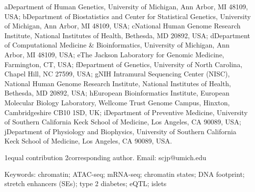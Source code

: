 aDepartment of Human Genetics, University of Michigan, Ann Arbor, MI 48109, USA; bDepartment of Biostatistics and Center for Statistical Genetics, University of Michigan, Ann Arbor, MI 48109, USA; cNational Human Genome Research Institute, National Institutes of Health, Bethesda, MD 20892, USA; dDepartment of Computational Medicine \& Bioinformatics, University of Michigan, Ann Arbor, MI 48109, USA; eThe Jackson Laboratory for Genomic Medicine, Farmington, CT, USA; fDepartment of Genetics, University of North Carolina, Chapel Hill, NC 27599, USA; gNIH Intramural Sequencing Center (NISC), National Human Genome Research Institute, National Institutes of Health, Bethesda, MD 20892, USA; hEuropean Bioinformatics Institute, European Molecular Biology Laboratory, Wellcome Trust Genome Campus, Hinxton, Cambridgeshire CB10 1SD, UK; iDepartment of Preventive Medicine, University of Southern California Keck School of Medicine, Los Angeles, CA 90089, USA; jDepartment of Physiology and Biophysics, University of Southern California Keck School of Medicine, Los Angeles, CA 90089, USA.



1equal contribution
2corresponding author. Email: scjp@umich.edu

Keywords: chromatin; ATAC-seq; mRNA-seq; chromatin states; DNA footprint; stretch enhancers (SEs); type 2 diabetes; eQTL; islets



